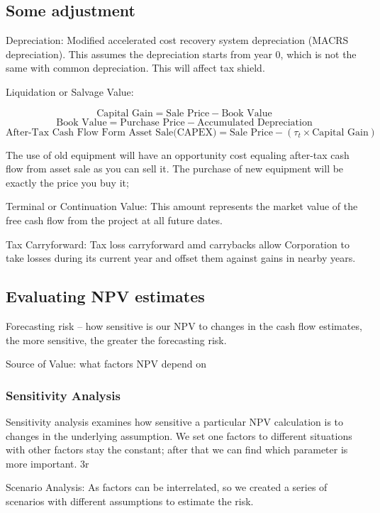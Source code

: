 \documentclass[10pt, a4paper]{article}
\begin{document}

    \subsection{Some adjustment}

    Depreciation: Modified accelerated cost recovery system depreciation (MACRS depreciation). This assumes the depreciation starts from year 0, which is not the same with common depreciation. This will affect tax shield.
    \medskip
    
    Liquidation or Salvage Value:

    $$\text{Capital Gain} = \text{Sale Price} - \text{Book Value}$$
    $$\text{Book Value} = \text{Purchase Price} - \text{Accumulated Depreciation}$$
    $$\text{After-Tax Cash Flow Form Asset Sale(CAPEX)} = \text{Sale Price} - (\tau_t \times \text{Capital Gain})$$

    The use of old equipment will have an opportunity cost equaling after-tax cash flow from asset sale as you can sell it. The purchase of new equipment will be exactly the price you buy it; 

    \medskip

    Terminal or Continuation Value: This amount represents the market value of the free cash flow from the project at all future dates. 


    Tax Carryforward: Tax loss carryforward  amd carrybacks allow Corporation to take losses during its current year and offset them against gains in nearby years. 

    \subsection{Evaluating NPV estimates} 
        Forecasting risk -- how sensitive is our NPV to changes in the cash flow estimates, the more sensitive, the greater the forecasting risk. 

        Source of Value: what factors NPV depend on

        \subsubsection{Sensitivity Analysis} 
            Sensitivity analysis examines how sensitive a particular NPV calculation is to changes in the underlying assumption. We set one factors to different situations with other factors stay the constant; after that we can find which parameter is more important. 3r

            Scenario Analysis: As factors can be interrelated, so we created a series of scenarios with different assumptions to estimate the risk. 
\end{document}
